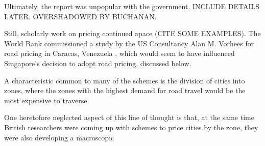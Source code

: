 Ultimately, the report was unpopular with the government. INCLUDE DETAILS LATER. OVERSHADOWED BY BUCHANAN.

Still, scholarly work on pricing continued apace (CITE SOME EXAMPLES). The World Bank commissioned a study by the US Consultancy Alan M. Vorhees for road pricing in Caracas, Venezuela \citep{Vorhees1973}, which would seem to have influenced Singapore's decision to adopt road pricing, discussed below.


A characteristic common to many of the schemes is the division of cities into zones, where the zones with the highest demand for road travel would be the most expensive to traverse. 

One heretofore neglected aspect of this line of thought is that, at the same time British researchers were coming up with schemes to price cities by the zone, they were also developing a macroscopic 
